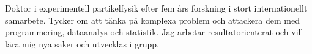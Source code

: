 

\begin{cvparagraph}

Doktor i experimentell partikelfysik efter fem års forskning i stort internationellt samarbete.
Tycker om att tänka på komplexa problem och attackera dem med programmering, dataanalys och statistik. %
Jag arbetar resultatorienterat och vill lära mig nya saker och utvecklas i grupp. %
\end{cvparagraph}